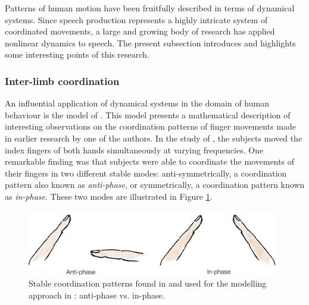 Patterns of human motion have been fruitfully described in terms of dynamical systems. Since speech production represents a highly intricate system of coordinated movements, a large and growing body of research has applied nonlinear dynamics to speech. The present subsection introduces and highlights some interesting points of this research.

\subsubsection{Inter-limb coordination}

An influential application of dynamical systems in the domain of human behaviour is the model of \citet{HakenKelsoBunz1985}. This model presents a mathematical description of interesting observations on the coordination patterns of finger movements made in earlier research by one of the authors. In the study of \citet{Kelso1981}, the subjects moved the index fingers of both hands simultaneously at varying frequencies. One remarkable finding was that subjects were able to coordinate the movements of their fingers in two different stable modes: anti-symmetrically, a coordination pattern also known as \emph{anti-phase}, or symmetrically, a coordination pattern known as \emph{in-phase}. These two modes are illustrated in Figure \ref{fig:hkb_fingers}.

\begin{figure}
\includegraphics[width=11cm]{figures/ch3/hkb_fingers.png}
\caption[Stable coordination patterns found in \citet{Kelso1981}.]{Stable coordination patterns found in \citet{Kelso1981} and used for the modelling approach in \citet{HakenKelsoBunz1985}: anti-phase vs. in-phase.}
\label{fig:hkb_fingers}
\end{figure}

